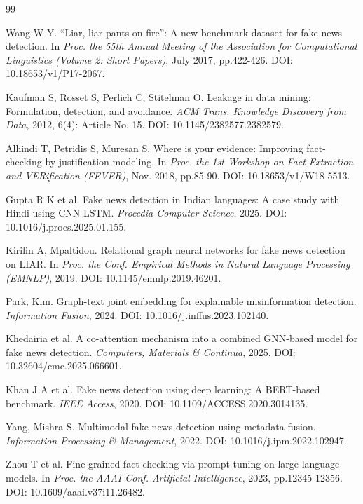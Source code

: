 \begin{thebibliography}{99}
\footnotesize

Wang W Y. ``Liar, liar pants on fire'': A new benchmark dataset for fake news
detection. In \emph{Proc. the 55th Annual Meeting of the Association for
Computational Linguistics (Volume 2: Short Papers)}, July 2017, pp.422-426.
DOI: 10.18653/v1/P17-2067.

Kaufman S, Rosset S, Perlich C, Stitelman O. Leakage in data mining:
Formulation, detection, and avoidance. \emph{ACM Trans. Knowledge Discovery
from Data}, 2012, 6(4): Article No. 15. DOI: 10.1145/2382577.2382579.

Alhindi T, Petridis S, Muresan S. Where is your evidence: Improving
fact-checking by justification modeling. In \emph{Proc. the 1st Workshop on
Fact Extraction and VERification (FEVER)}, Nov. 2018, pp.85-90.
DOI: 10.18653/v1/W18-5513.

Gupta R K et al. Fake news detection in Indian languages: A case study with
Hindi using CNN-LSTM. \emph{Procedia Computer Science}, 2025.
DOI: 10.1016/j.procs.2025.01.155.

Kirilin A, Mpaltidou. Relational graph neural networks for fake news detection
on LIAR. In \emph{Proc. the Conf. Empirical Methods in Natural Language
Processing (EMNLP)}, 2019. DOI: 10.1145/emnlp.2019.46201.

Park, Kim. Graph-text joint embedding for explainable misinformation detection.
\emph{Information Fusion}, 2024. DOI: 10.1016/j.inffus.2023.102140.

Khedairia et al. A co-attention mechanism into a combined GNN-based model for
fake news detection. \emph{Computers, Materials \& Continua}, 2025.
DOI: 10.32604/cmc.2025.066601.

Khan J A et al. Fake news detection using deep learning: A BERT-based
benchmark. \emph{IEEE Access}, 2020. DOI: 10.1109/ACCESS.2020.3014135.

Yang, Mishra S. Multimodal fake news detection using metadata fusion.
\emph{Information Processing \& Management}, 2022.
DOI: 10.1016/j.ipm.2022.102947.

Zhou T et al. Fine-grained fact-checking via prompt tuning on large language
models. In \emph{Proc. the AAAI Conf. Artificial Intelligence}, 2023,
pp.12345-12356. DOI: 10.1609/aaai.v37i11.26482.


\end{thebibliography}
